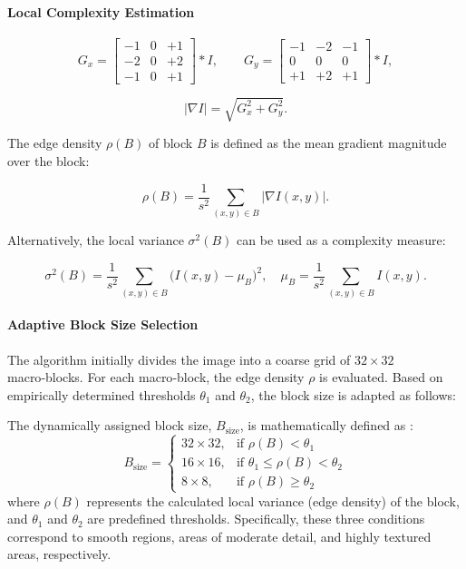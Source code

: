 \paragraph{Local Complexity Estimation}

\[
G_x = \begin{bmatrix}
-1 & 0 & +1 \\
-2 & 0 & +2 \\
-1 & 0 & +1
\end{bmatrix} * I,\qquad 
G_y = \begin{bmatrix}
-1 & -2 & -1 \\
 0 &  0 &  0 \\
+1 & +2 & +1
\end{bmatrix} * I,
\] 

\[
|\nabla I| = \sqrt{G_x^2 + G_y^2}.
\] 

The edge density $\rho(B)$ of block $B$ is defined as the mean gradient magnitude over the block\cite{Khaleel2014}:

\[
\rho(B) = \frac{1}{s^2} \sum_{(x,y)\in B} |\nabla I(x,y)|. 
\]

Alternatively, the local variance $\sigma^2(B)$ can be used as a complexity measure\cite{Ranganathan1995}:

\[ 
\sigma^2(B) = \frac{1}{s^2} \sum_{(x,y)\in B} \bigl(I(x,y) - \mu_B\bigr)^2,\quad 
\mu_B = \frac{1}{s^2} \sum_{(x,y)\in B} I(x,y).
\]

\paragraph{Adaptive Block Size Selection}

The algorithm initially divides the image into a coarse grid of $32 \times 32$ macro‑blocks. For each macro‑block, the edge density $\rho$ is evaluated. Based on empirically determined thresholds $\theta_1$ and $\theta_2$, the block size is adapted as follows:


The dynamically assigned block size, $B_{\text{size}}$, is mathematically defined as \cite{Ranganathan1995}:
\begin{equation}
    B_{\text{size}} = 
    \begin{cases}
        32 \times 32, & \text{if } \rho(B) < \theta_1 \\
        16 \times 16, & \text{if } \theta_1 \le \rho(B) < \theta_2 \\
        8 \times 8,   & \text{if } \rho(B) \ge \theta_2
    \end{cases}
\end{equation}
where $\rho(B)$ represents the calculated local variance (edge density) of the block, and $\theta_1$ and $\theta_2$ are predefined thresholds. Specifically, these three conditions correspond to smooth regions, areas of moderate detail, and highly textured areas, respectively.



